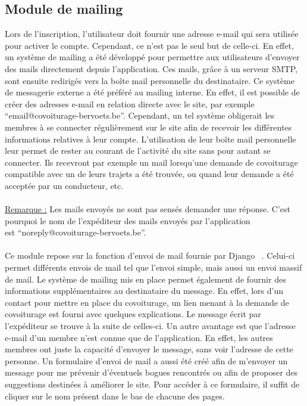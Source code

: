 \documentclass[12pt, a4paper, oneside]{article}
\begin{document}
\subsection{Module de mailing} \label{mail}
    Lors de l'inscription, l'utilisateur doit fournir une adresse e-mail qui sera utilisée pour activer le compte. Cependant, ce n'est pas le seul but de celle-ci. En effet, un système de mailing a été développé pour permettre aux utilisateurs d'envoyer des mails directement depuis l'application. Ces mails, grâce à un serveur SMTP, sont ensuite redirigés vers la boîte mail personnelle du destinataire. Ce système de messagerie externe a été préféré au mailing interne. En effet, il est possible de créer des adresses e-mail en relation directe avec le site, par exemple ``email@covoiturage-bervoets.be''. Cependant, un tel système obligerait les membres à se connecter régulièrement sur le site afin de recevoir les différentes informations relatives à leur compte. L'utilisation de leur boîte mail personnelle leur permet de rester au courant de l'activité du site sans pour autant se connecter. Ils recevront par exemple un mail lorsqu'une demande de covoiturage compatible avec un de leurs trajets a été trouvée, ou quand leur demande a été acceptée par un conducteur, etc.\\\\
    \underline{Remarque :} Les mails envoyés ne sont pas sensés demander une réponse. C'est pourquoi le nom de l'expéditeur des mails envoyés par l'application \\est ``noreply@covoiturage-bervoets.be''.\\\\
    \indent Ce module repose sur la fonction d'envoi de mail fournie par Django ~\cite{django-mail}. Celui-ci permet différents envois de mail tel que l'envoi simple, mais aussi un envoi massif de mail. %
    Le système de mailing mis en place permet également de fournir des informations supplémentaires au destinataire du message. En effet, lors d'un contact pour mettre en place du covoiturage, un lien menant à la demande de covoiturage est fourni avec quelques explications. Le message écrit par l'expéditeur se trouve à la suite de celles-ci. Un autre avantage est que l'adresse e-mail d'un membre n'est connue que de l'application. En effet, les autres membres ont juste la capacité d'envoyer le message, sans voir l'adresse de cette personne. Un formulaire d'envoi de mail a aussi été créé afin de m'envoyer un message pour me prévenir d'éventuels bogues rencontrés ou afin de proposer des suggestions destinées à améliorer le site. Pour accéder à ce formulaire, il suffit de cliquer sur le nom présent dans le bas de chacune des pages.\\\\
\end{document}
